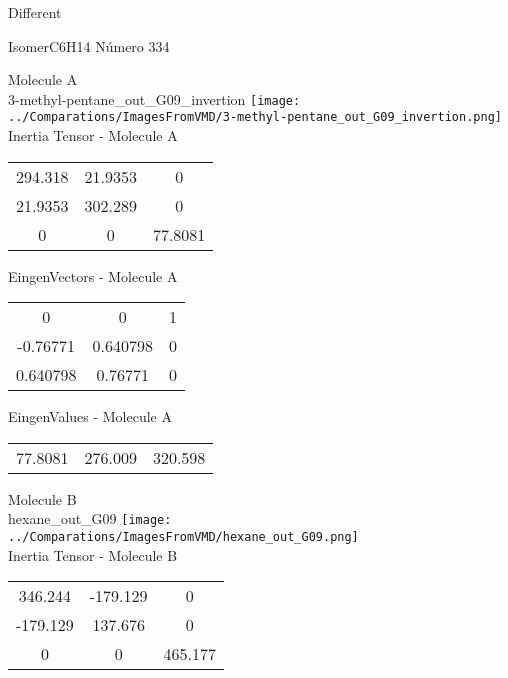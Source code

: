 \begin{center}
\vtab
\vtab
\textcolor{NavyBlue}{\Large Different}
\end{center}

 \newpage

\vtab[-2cm]
\begin{center}
{\large IsomerC6H14 \tab Número 334}
\end{center}
\begin{multicols}{2}
\begin{center}

Molecule A \\ 
3-methyl-pentane\_out\_G09\_invertion
\texttt{[image: ../Comparations/ImagesFromVMD/3-methyl-pentane\_out\_G09\_invertion.png]}
\\
Inertia Tensor - Molecule A \\
\vtab

\begin{tabular}{|c c c|}
294.318	 & 	21.9353	 & 	0	 \\
21.9353	 & 	302.289	 & 	0	 \\
0	 & 	0	 & 	77.8081
\end{tabular}

\vtab
 EingenVectors - Molecule A     \\
\vtab
\begin{tabular}{|c c c|}
0	 & 	0	 & 	1	 \\
-0.76771	 & 	0.640798	 & 	0	 \\
0.640798	 & 	0.76771	 & 	0
\end{tabular}

\vtab
 EingenValues - Molecule A     \\
\vtab
\begin{tabular}{|c c c|}
77.8081	 & 	276.009	 & 	320.598	 \\
\end{tabular}
\columnbreak

Molecule B \\ 
hexane\_out\_G09
\texttt{[image: ../Comparations/ImagesFromVMD/hexane\_out\_G09.png]}
\\
Inertia Tensor - Molecule B \\
\vtab

\begin{tabular}{|c c c|}
346.244	 & 	-179.129	 & 	0	 \\
-179.129	 & 	137.676	 & 	0	 \\
0	 & 	0	 & 	465.177
\end{tabular}


\end{center}
\end{multicols}
